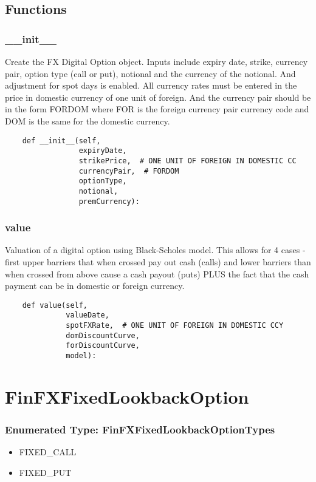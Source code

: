 \documentclass[twoside,11pt]{book}
\begin{document}
\subsection*{Functions}

\subsubsection*{{\bf \_\_init\_\_}}
Create the FX Digital Option object. Inputs include expiry date, strike, currency pair, option type (call or put), notional and the currency of the notional. And adjustment for spot days is enabled. All currency rates must be entered in the price in domestic currency of one unit of foreign. And the currency pair should be in the form FORDOM where FOR is the foreign currency pair currency code and DOM is the same for the domestic currency.  

\begin{lstlisting}
    def __init__(self,
                 expiryDate,
                 strikePrice,  # ONE UNIT OF FOREIGN IN DOMESTIC CC
                 currencyPair,  # FORDOM
                 optionType,
                 notional,
                 premCurrency):
\end{lstlisting}

\subsubsection*{{\bf value}}
Valuation of a digital option using Black-Scholes model. This allows for 4 cases - first upper barriers that when crossed pay out cash (calls) and lower barriers than when crossed from above cause a cash payout (puts) PLUS the fact that the cash payment can be in domestic or foreign currency.  

\begin{lstlisting}
    def value(self,
              valueDate,
              spotFXRate,  # ONE UNIT OF FOREIGN IN DOMESTIC CCY
              domDiscountCurve,
              forDiscountCurve,
              model):
\end{lstlisting}

\newpage
\section{FinFXFixedLookbackOption}

\subsubsection{Enumerated Type: FinFXFixedLookbackOptionTypes}
\begin{itemize}
\item{FIXED\_CALL}
\item{FIXED\_PUT}
\end{itemize}
\end{document}
